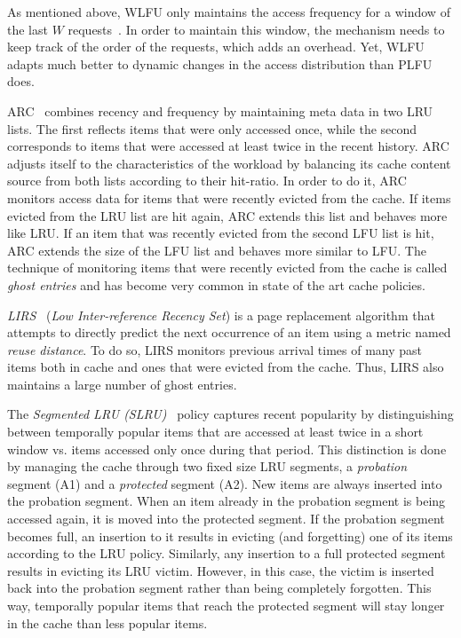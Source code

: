 \documentclass[10pt,a4paper]{article}
\begin{document}
As mentioned above, WLFU only maintains the access frequency for a window of the last $W$ requests~\cite{WLFU}.
In order to maintain this window, the mechanism needs to keep track of the order of the requests, which adds an overhead.
Yet, WLFU adapts much better to dynamic changes in the access distribution than PLFU does.


ARC~\cite{ARC,ARCpatent} combines recency and frequency by maintaining meta data in two LRU lists.
The first reflects items that were only accessed once, while the second corresponds to items that were accessed at least twice in the recent history.
ARC adjusts itself to the characteristics of the workload by balancing its cache content source from both lists according to their hit-ratio.
In order to do it, ARC monitors access data for items that were recently evicted from the cache.
If items evicted from the LRU list are hit again, ARC extends this list and behaves more like LRU.
If an item that was recently evicted from the second LFU list is hit, ARC extends the size of the LFU list and behaves more similar to LFU.
The technique of monitoring items that were recently evicted from the cache is called \emph{ghost entries} and has become very common in state of the art cache policies.

\emph{LIRS}~\cite{LIRS} (\emph{Low Inter-reference Recency Set}) is a page replacement algorithm that attempts to directly predict the next occurrence of an item using a metric named \emph{reuse distance}.
To do so, LIRS monitors previous arrival times of many past items both in cache and ones that were evicted from the cache.
Thus, LIRS also maintains a large number of ghost entries.

The \emph{Segmented LRU (SLRU)}~\cite{SLRU} policy captures recent popularity by distinguishing between temporally popular items that are accessed at least twice in a short window vs. items accessed only once during that period.
This distinction is done by managing the cache through two fixed size LRU segments, a \emph{probation} segment (A1) and a \emph{protected} segment (A2).
New items are always inserted into the probation segment.
When an item already in the probation segment is being accessed again, it is moved into the protected segment.
If the probation segment becomes full, an insertion to it results in evicting (and forgetting) one of its items according to the LRU policy.
Similarly, any insertion to a full protected segment results in evicting its LRU victim.
However, in this case, the victim is inserted back into the probation segment rather than being completely forgotten.
This way, temporally popular items that reach the protected segment will stay longer in the cache than less popular items.
\end{document}
